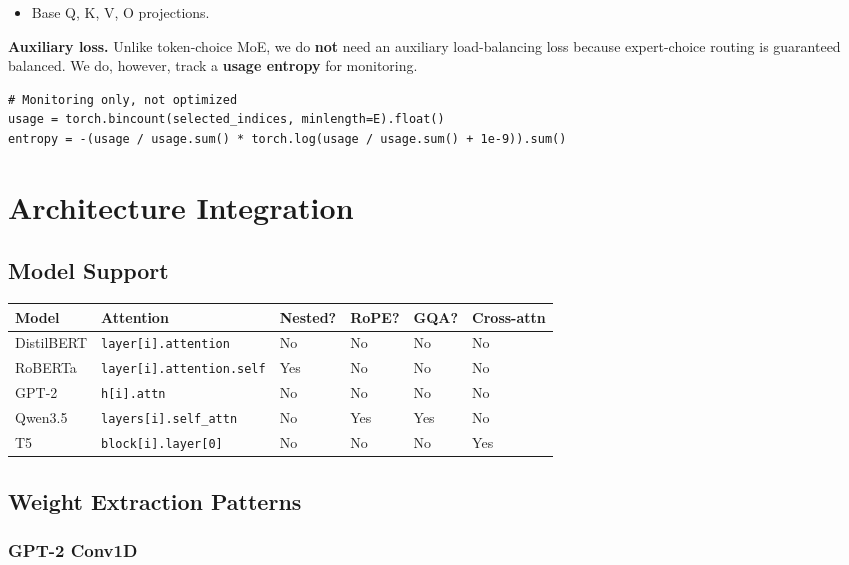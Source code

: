 \begin{itemize}
\item Base Q, K, V, O projections.

\end{itemize}
\textbf{Auxiliary loss.} Unlike token-choice MoE, we do \textbf{not} need an 
auxiliary load-balancing loss because expert-choice routing is guaranteed 
balanced. We do, however, track a \textbf{usage entropy} for monitoring.

\begin{lstlisting}
# Monitoring only, not optimized
usage = torch.bincount(selected_indices, minlength=E).float()
entropy = -(usage / usage.sum() * torch.log(usage / usage.sum() + 1e-9)).sum()
\end{lstlisting}



\section{Architecture Integration}

\subsection{Model Support}

\begin{table}[H]
\centering
\small
\begin{tabular}{llllll}
\toprule
\textbf{Model} & \textbf{Attention} & \textbf{Nested?} & \textbf{RoPE?} & \textbf{GQA?} & \textbf{Cross-attn} \\
\midrule
DistilBERT & \texttt{layer[i].attention} & No & No & No & No \\
RoBERTa & \texttt{layer[i].attention.self} & Yes & No & No & No \\
GPT-2 & \texttt{h[i].attn} & No & No & No & No \\
Qwen3.5 & \texttt{layers[i].self\_attn} & No & Yes & Yes & No \\
T5 & \texttt{block[i].layer[0]} & No & No & No & Yes \\
\bottomrule
\end{tabular}
\end{table}

\subsection{Weight Extraction Patterns}

\subsubsection{GPT-2 Conv1D}

